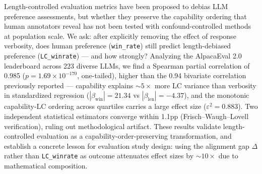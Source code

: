 Length-controlled evaluation metrics have been proposed to debias LLM preference assessments,
but whether they preserve the capability ordering that human annotators reveal has not been
tested with confound-controlled methods at population scale. We ask: after explicitly removing
the effect of response verbosity, does human preference (\texttt{win\_rate}) still predict
length-debiased preference (\texttt{LC\_winrate}) --- and how strongly? Analyzing the
AlpacaEval 2.0 leaderboard across 223 diverse LLMs, we find a Spearman partial correlation of
0.985 ($p = 1.69 \times 10^{-170}$, one-tailed), higher than the 0.94 bivariate correlation
previously reported --- capability explains ${\sim}5\times$ more LC variance than verbosity in
standardized regression ($|\beta_{\mathrm{win}}| = 21.34$ vs $|\beta_{\mathrm{len}}| = -4.37$),
and the monotonic capability-LC ordering across quartiles carries a large effect size
($\varepsilon^2 = 0.883$). Two independent statistical estimators converge within 1.1pp
(Frisch--Waugh--Lovell verification), ruling out methodological artifact. These results validate
length-controlled evaluation as a capability-order-preserving transformation, and establish a
concrete lesson for evaluation study design: using the alignment gap $\Delta$ rather than
\texttt{LC\_winrate} as outcome attenuates effect sizes by ${\sim}10\times$ due to mathematical
composition.
